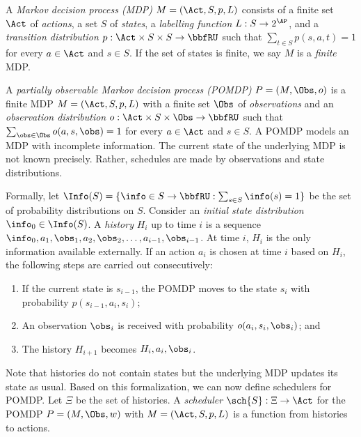 A \emph{Markov decision process (MDP)} $M = (\Act, S, p, L)$ consists of
a finite set $\Act$ of \emph{actions}, a set $S$ of \emph{states}, a
\emph{labelling function} $L : S \rightarrow 2^{\AP}$, and 
a \emph{transition distribution} $p : \Act \times S \times S
\rightarrow \bbfRU$ such that $\sum_{t \in S} p (s, a, t) = 1$
for every $a \in \Act$ and $s \in S$. If the set of states is finite,
we say $M$ is a \emph{finite} MDP.

A \emph{partially observable Markov decision process (POMDP)} $P =
(M, \Obs, o)$ is a finite MDP $M = (\Act, S, p, L)$ with a finite set
$\Obs$ of \emph{observations} and an \emph{observation distribution} $o
: \Act  \times S \times \Obs \rightarrow \bbfRU$ such that $\sum_{\obs
  \in \Obs} o (a, s, \obs) = 1$ for every $a \in \Act$ and $s \in S$.
A POMDP models an MDP with incomplete information. The current state
of the underlying MDP is not known precisely. Rather, schedules are
made by observations and state distributions. 

Formally, let $\Info (S) = \{ \info \in S \rightarrow \bbfRU : \sum_{s \in
 S} \info (s) = 1 \}$ be the set of probability distributions on $S$. 
Consider an \emph{initial state distribution} $\info_0 \in \Info (S)$. A
\emph{history} $H_i$ up to time $i$ is a sequence $\info_0, a_1, \obs_1,
a_2, \obs_2, \ldots, a_{i-1}, \obs_{i-1}$. At time $i$, $H_i$ is the
only information available externally. If an action $a_i$ is chosen
at time $i$ based on $H_i$, the following steps are carried out
consecutively:
\begin{enumerate}
\item If the current state is $s_{i-1}$, the POMDP moves to the state
  $s_i$ with probability $p (s_{i-1}, a_i, s_i)$;
\item An observation $\obs_i$ is received with probability $o (a_i, s_i,
  \obs_i)$; and
\item The history $H_{i+1}$ becomes $H_i, a_i, \obs_i$.
\end{enumerate}
Note that histories do not contain states but the underlying MDP
updates its state as usual. Based on this formalization, we can now
define schedulers for POMDP. Let $\Xi$ be the set of histories. A
\emph{scheduler} $\sch{S} : \Xi \rightarrow \Act$ for the POMDP $P
= (M, \Obs, w)$ with $M = (\Act, S, p, L)$ is a function
from histories to actions. 

